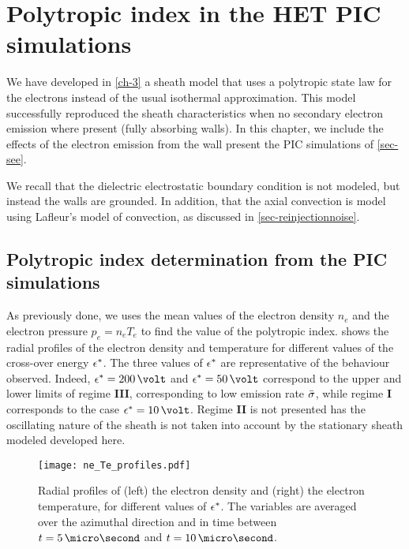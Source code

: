 

\section{Polytropic index in the \ac{HET} \ac{PIC} simulations}
\label{sec-PIC_poly}

We have developed in \cref{ch-3} a sheath model that uses a polytropic state law for the electrons instead of the usual isothermal approximation.
This model successfully reproduced the sheath characteristics  when no secondary electron emission where present (fully absorbing walls).
In this chapter, we include the effects of the electron emission from the wall present the \ac{PIC} simulations of \cref{sec-see}.

We recall that the dielectric electrostatic boundary condition is not modeled, but instead the walls are grounded.
In addition, that the axial convection is model using Lafleur's model of convection, as discussed in \cref{sec-reinjectionnoise}.

\subsection{Polytropic index determination from the PIC simulations} \label{subsec-fluid_see_polyfit}

As previously done, we uses the mean values of the electron density $n_e$ and the electron pressure $ p_e = n_e T_e$ to find the value of the polytropic index.
 shows the radial profiles of the electron density and temperature for different values of the cross-over energy $\epsilon^{*}$.
The three values of $\epsilon^{*}$ are representative of the behaviour observed.
Indeed, $\crover=200\,\volt$ and $\crover=50\,\volt$ correspond to the upper and lower limits of regime {\bf III}, corresponding to low emission rate $ \bar{\sigma }$, while regime {\bf I} corresponds to the case $\crover=10\,\volt$.
Regime {\bf II} is not presented has the oscillating nature of the sheath is not taken into account by the stationary sheath modeled developed here. 


\begin{figure}[hbtp]
  \centering
  \texttt{[image: ne\_Te\_profiles.pdf]}
  \caption{Radial profiles of (left) the electron density and (right) the electron temperature, for different values of $\epsilon^{*}$. The variables are averaged over the azimuthal direction and in time between $t=5\,\micro\second$ and $t=10\,\micro\second$.  }
  \label{fig-radial_profiles_see}
\end{figure}


